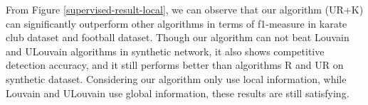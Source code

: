 \documentclass[\main/thesis.tex]{subfiles}
\begin{document}

From Figure \ref{supervised-result-local}, we can observe that our algorithm (UR+K) can significantly outperform other algorithms in terms of f1-measure in karate club dataset and football dataset. Though our algorithm can not beat Louvain and ULouvain algorithms in synthetic network, it also shows competitive detection accuracy, and it still performs better than algorithms R and UR on synthetic dataset. Considering our algorithm only use local information, while Louvain and ULouvain use global information, these results are still satisfying. %


\end{document}
